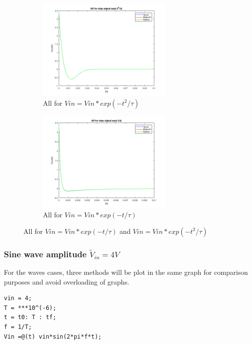 \documentclass[11pt,a4paper]{article}
\begin{document}
\begin{figure}[h]
\begin{subfigure}{.5\textwidth}
  \includegraphics[width=.9\linewidth,height = 5cm]{Ex1_Figs/all_t2.png}
  \caption[right]{All for $Vin = Vin*exp(-t^2/\tau)$}
  \label{fig:RL12}
\end{subfigure}
\begin{subfigure}{.5\textwidth}
  \includegraphics[width=.9\linewidth,height = 5cm]{Ex1_Figs/all_t.png}
  \caption{All for $Vin = Vin*exp(-t/\tau)$}
  \label{fig:RL13}
\end{subfigure}
\caption{All for $Vin = Vin*exp(-t/\tau)$ and $Vin = Vin*exp(-t^2/\tau)$}
\label{fig:test3}
\end{figure}

\newpage
\subsubsection{Sine wave amplitude $\tilde{V}_{in} = 4V$}

For the waves cases, three methods will be plot in the same graph for comparison purposes and avoid overloading of graphs.

\begin{verbatim}
vin = 4;
T = ***10^(-6);
t = t0: T : tf;
f = 1/T;
Vin =@(t) vin*sin(2*pi*f*t);
\end{verbatim}
\end{document}
